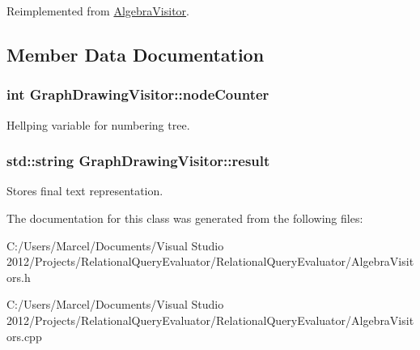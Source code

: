 Reimplemented from \hyperlink{class_algebra_visitor_a681732083691701f0e9c10980392dd3c}{Algebra\+Visitor}.



\subsection{Member Data Documentation}
\hypertarget{class_graph_drawing_visitor_a0761312fb1e24b1951c0b263b19f268c}{
\subsubsection[{node\+Counter}]{\setlength{\rightskip}{0pt plus 5cm}int Graph\+Drawing\+Visitor\+::node\+Counter}}\label{class_graph_drawing_visitor_a0761312fb1e24b1951c0b263b19f268c}
Hellping variable for numbering tree. \hypertarget{class_graph_drawing_visitor_a99563612519b31409a263df7b3ae2372}{
\subsubsection[{result}]{\setlength{\rightskip}{0pt plus 5cm}std\+::string Graph\+Drawing\+Visitor\+::result}}\label{class_graph_drawing_visitor_a99563612519b31409a263df7b3ae2372}
Stores final text representation. 

The documentation for this class was generated from the following files\+:\begin{DoxyCompactItemize}
\item 
C\+:/\+Users/\+Marcel/\+Documents/\+Visual Studio 2012/\+Projects/\+Relational\+Query\+Evaluator/\+Relational\+Query\+Evaluator/Algebra\+Visitors.\+h\item 
C\+:/\+Users/\+Marcel/\+Documents/\+Visual Studio 2012/\+Projects/\+Relational\+Query\+Evaluator/\+Relational\+Query\+Evaluator/Algebra\+Visitors.\+cpp\end{DoxyCompactItemize}
